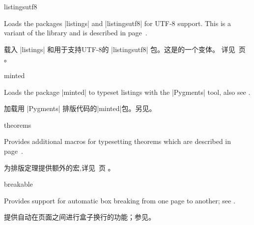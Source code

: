 \begin{docTcbKey}[library]{listingsutf8}{}{}

Loads the packages |listings| %
 and |listingsutf8| %
  for UTF-8 support.
This is a variant of the library 
and is described in %
page~\pageref{sec:listings}.

载入 |listings| 和用于支持UTF-8的 |listingsutf8| 包。这是的一个变体。%
详见~\pageref{sec:listings}页%
。

\end{docTcbKey}

\begin{docTcbKey}[library]{minted}{}{}

Loads the package |minted| %
to typeset listings with the |Pygments| %
 tool, also see .

加载用 |Pygments| %
排版代码的|minted|包。另见。

\end{docTcbKey}

\begin{docTcbKey}[library]{theorems}{}{}

Provides additional
macros for typesetting theorems which are described in %
page~\pageref{sec:theorems}.

为排版定理提供额外的宏,详见~\pageref{sec:theorems}页%
。

\end{docTcbKey}


\begin{docTcbKey}[library]{breakable}{}{}

Provides support for automatic box breaking from one page to another;
see .


提供自动在页面之间进行盒子换行的功能；参见。

\end{docTcbKey}


